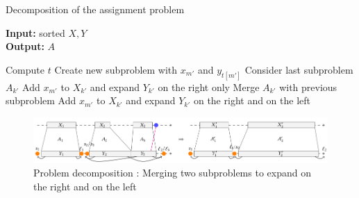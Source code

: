 \documentclass[11pt]{beamer}
\begin{document}
\begin{frame}

\begin{algorithm}[H]
\caption{Decomposition of the assignment problem}\label{subproblem}
\scriptsize
\hspace*{\algorithmicindent} \textbf{Input:} sorted $X,Y$\\
\hspace*{\algorithmicindent} \textbf{Output:} $A$ 
\begin{algorithmic}[2]
\State Compute $t$
		\State Create new subproblem with $x_{m'}$ and $y_{t[m']}$
    \Else
        \State Consider last subproblem $A_{k'}$
        	\State Add $x_{m'}$ to $X_{k'}$ and expand $Y_{k'}$ on the right only
        \Else
        		\State Merge $A_{k'}$ with previous subproblem
        	\EndWhile
        	\State Add $x_{m'}$ to $X_{k'}$ and expand $Y_{k'}$ on the right and on the left
        \EndIf
    \EndIf
\EndFor
\State {}
\end{algorithmic}
\end{algorithm}

\end{frame}

\begin{frame}
\begin{figure}
\includegraphics[scale=0.35, trim = 1cm 0cm 0cm 0cm]{ex_decomp.png}
\caption{Problem decomposition : Merging two subproblems to expand on the right and on the left}
\end{figure}
\end{frame}
\end{document}
